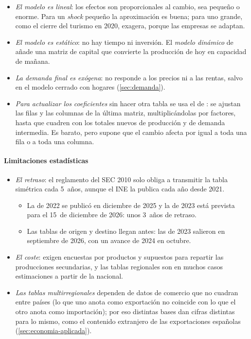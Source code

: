 \documentclass[11pt]{article}
\begin{document}
\begin{itemize}
\item \emph{El modelo es lineal}: los efectos son proporcionales al cambio, sea pequeño o enorme. Para un \emph{shock} pequeño la aproximación es buena; para uno grande, como el cierre del turismo en 2020, exagera, porque las empresas se adaptan.
\item \emph{El modelo es estático}: no hay tiempo ni inversión. El \emph{modelo dinámico} de  añade una matriz de capital que convierte la producción de hoy en capacidad de mañana.
\item \emph{La demanda final es exógena}: no responde a los precios ni a las rentas, salvo en el modelo cerrado con hogares (\ref{sec:demanda}).
\item \emph{Para actualizar los coeficientes} sin hacer otra tabla se usa el  de \textcite{Stone1961}: se ajustan las filas y las columnas de la última matriz, multiplicándolas por factores, hasta que cuadren con los totales nuevos de producción y de demanda intermedia. Es barato, pero supone que el cambio afecta por igual a toda una fila o a toda una columna.
\end{itemize}

\paragraph{Limitaciones estadísticas}

\begin{itemize}
\item \emph{El retraso}: el reglamento del SEC 2010 solo obliga a transmitir la tabla simétrica cada 5~años, aunque el INE la publica cada año desde 2021\nocite{INE2025TIO2022}.
  \begin{itemize}
  \item La de 2022 se publicó en diciembre de 2025 y la de 2023 está prevista para el 15~de diciembre de 2026\nocite{INE2026Calendario}: unos 3~años de retraso.
  \item Las tablas de origen y destino llegan antes: las de 2023 salieron en septiembre de 2026, con un avance de 2024 en octubre\nocite{INE2026TOD}.
  \end{itemize}
\item \emph{El coste}: exigen encuestas por productos y supuestos para repartir las producciones secundarias, y las tablas regionales son en muchos casos estimaciones a partir de la nacional.
\item \emph{Las tablas multirregionales} dependen de datos de comercio que no cuadran entre países (lo que uno anota como exportación no coincide con lo que el otro anota como importación); por eso distintas bases dan cifras distintas para lo mismo, como el contenido extranjero de las exportaciones españolas (\ref{sec:economia-aplicada}).
\end{itemize}
\end{document}
